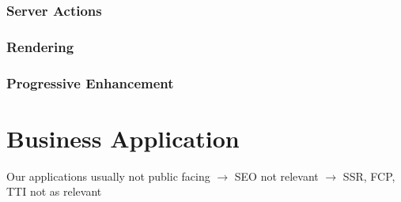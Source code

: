\subsubsection{Server Actions}
\label{sec:sveltekit-server-actions}
 
\subsubsection{Rendering}

\subsubsection{Progressive Enhancement}

\section{Business Application}
\label{sec:business-application}

Our applications usually not public facing $\rightarrow$ SEO not relevant $\rightarrow$ SSR, FCP, TTI not as relevant
